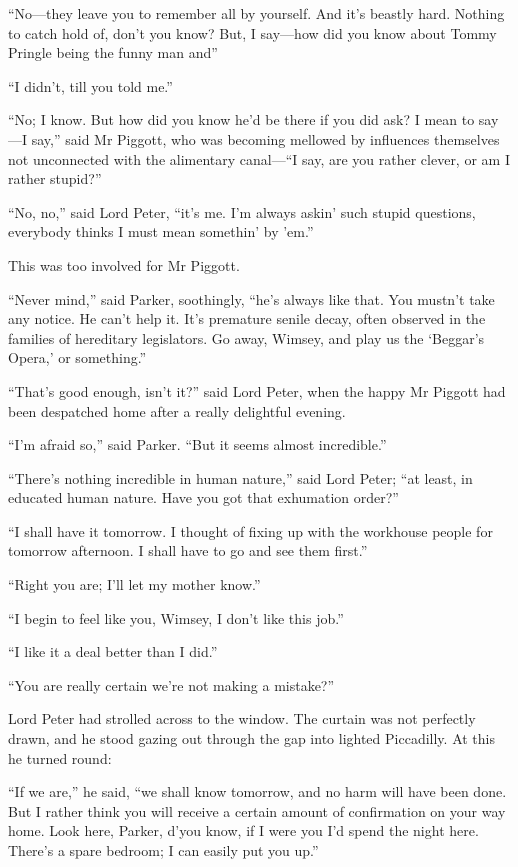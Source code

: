 \enquote{No\allowbreak---\allowbreak they leave you to remember all by yourself. And it’s beastly hard. Nothing to catch hold of, don’t you know? But, I say\allowbreak---\allowbreak how did you know about Tommy Pringle being the funny man and\longdash}

\enquote{I didn’t, till you told me.}

\enquote{No; I know. But how did you know he’d be there if you did ask? I mean to say\allowbreak---\allowbreak I say,} said Mr Piggott, who was becoming mellowed by influences themselves not unconnected with the alimentary canal---\enquote{I say, are you rather clever, or am I rather stupid?}

\enquote{No, no,} said Lord Peter, \enquote{it’s me. I’m always askin’ such stupid questions, everybody thinks I must mean somethin’ by ’em.}

This was too involved for Mr Piggott.

\enquote{Never mind,} said Parker, soothingly, “he’s always like that. You mustn’t take any notice. He can’t help it. It’s premature senile decay, often observed in the families of hereditary legislators. Go away, Wimsey, and play us the ‘Beggar’s Opera,’ or something.”

\enquote{That’s good enough, isn’t it?} said Lord Peter, when the happy Mr Piggott had been despatched home after a really delightful evening.

\enquote{I’m afraid so,} said Parker. \enquote{But it seems almost incredible.}

\enquote{There’s nothing incredible in human nature,} said Lord Peter; \enquote{at least, in educated human nature. Have you got that exhumation order?}

\enquote{I shall have it tomorrow. I thought of fixing up with the workhouse people for tomorrow afternoon. I shall have to go and see them first.}

\enquote{Right you are; I’ll let my mother know.}

\enquote{I begin to feel like you, Wimsey, I don’t like this job.}

\enquote{I like it a deal better than I did.}

\enquote{You are really certain we’re not making a mistake?}

Lord Peter had strolled across to the window. The curtain was not perfectly drawn, and he stood gazing out through the gap into lighted Piccadilly. At this he turned round:

\enquote{If we are,} he said, \enquote{we shall know tomorrow, and no harm will have been done. But I rather think you will receive a certain amount of confirmation on your way home. Look here, Parker, d’you know, if I were you I’d spend the night here. There’s a spare bedroom; I can easily put you up.}

